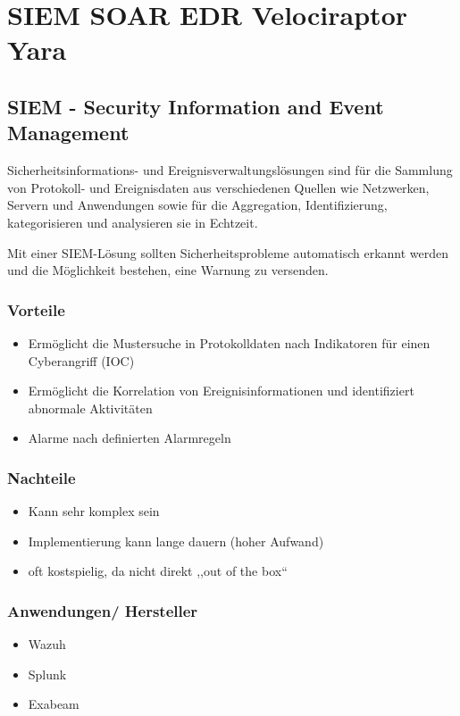 

\section{SIEM SOAR EDR Velociraptor Yara}

\subsection{SIEM - Security Information and Event Management}
Sicherheitsinformations- und Ereignisverwaltungslösungen sind für die Sammlung von Protokoll- und Ereignisdaten aus verschiedenen Quellen wie Netzwerken, Servern und Anwendungen sowie für die Aggregation, Identifizierung, kategorisieren und analysieren sie in Echtzeit.

Mit einer SIEM-Lösung sollten Sicherheitsprobleme automatisch erkannt werden und die Möglichkeit bestehen, eine Warnung zu versenden.

\subsubsection{Vorteile}
\begin{itemize}
    \item Ermöglicht die Mustersuche in Protokolldaten nach Indikatoren für einen Cyberangriff (IOC)
    \item Ermöglicht die Korrelation von Ereignisinformationen und identifiziert abnormale Aktivitäten
    \item Alarme nach definierten Alarmregeln
\end{itemize}

\subsubsection{Nachteile}
\begin{itemize}
    \item Kann sehr komplex sein
    \item Implementierung kann lange dauern (hoher Aufwand)
    \item oft kostspielig, da nicht direkt ,,out of the box``
\end{itemize}

\subsubsection{Anwendungen/ Hersteller}
\begin{itemize}
    \item Wazuh
    \item Splunk
    \item Exabeam
\end{itemize}

